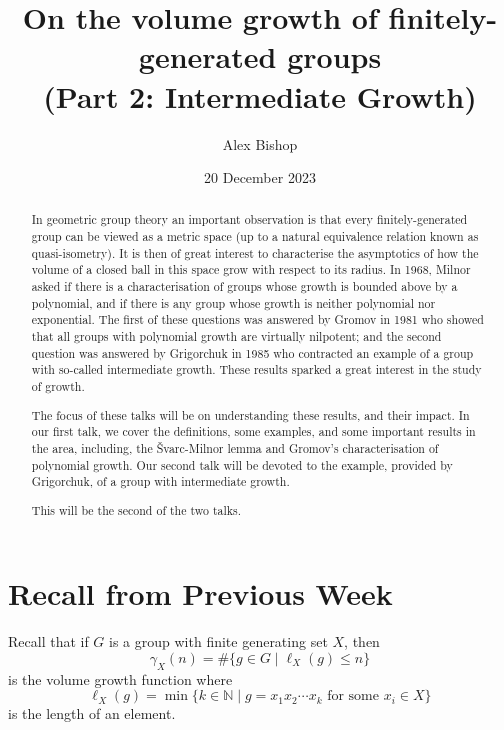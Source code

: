 \documentclass[11pt,a4paper,reqno]{amsart}
\theoremstyle{plain}
\theoremstyle{definition}
\theoremstyle{definition}
\renewcommand\leq\leqslant
\begin{document}
\title{On the volume growth of finitely-generated groups\\(Part 2: Intermediate Growth)}
\author{Alex Bishop}
\date{20 December 2023}
\address{%
	Section de mathématiques\\
	Université de Genève\\
	rue du Conseil-Général~7-9\\
	1205 Genève, Switzerland}

\begin{abstract}
In geometric group theory an important observation is that every finitely-generated group can be viewed as a metric space (up to a natural equivalence relation known as quasi-isometry). It is then of great interest to characterise the asymptotics of how the volume of a closed ball in this space grow with respect to its radius. In 1968, Milnor asked if there is a characterisation of groups whose growth is bounded above by a polynomial, and if there is any group whose growth is neither polynomial nor exponential. The first of these questions was answered by Gromov in 1981 who showed that all groups with polynomial growth are virtually nilpotent; and the second question was answered by Grigorchuk in 1985 who contracted an example of a group with so-called intermediate growth. These results sparked a great interest in the study of growth.

The focus of these talks will be on understanding these results, and their impact. In our first talk, we cover the definitions, some examples, and some important results in the area, including, the Švarc-Milnor lemma and Gromov's characterisation of polynomial growth. Our second talk will be devoted to the example, provided by Grigorchuk, of a group with intermediate growth.

This will be the second of the two talks.
\end{abstract}
\maketitle

\section{Recall from Previous Week}

Recall that if $G$ is a group with finite generating set $X$, then
\[
  \gamma_X(n)
  =
  \#\{
    g\in G
  \mid
    \ell_X(g)\leq n
  \}
\]
is the volume growth function where
\[
  \ell_X(g)
  =
  \min\{
    k\in \mathbb N
  \mid
    g =x_1 x_2 \cdots x_k
    \text{ for some }
    x_i\in X
  \}
\]
is the length of an element.
\end{document}
